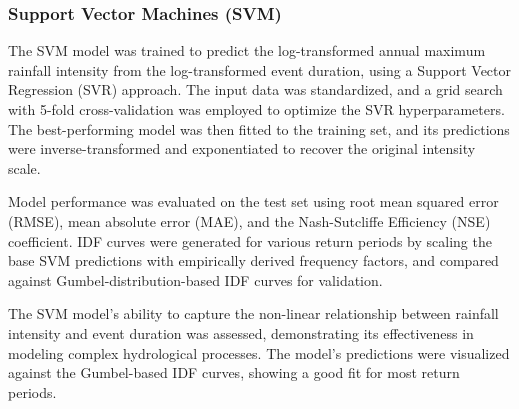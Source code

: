 \subsubsection{Support Vector Machines (SVM)}
The SVM model was trained to predict the log-transformed annual maximum rainfall intensity from the log-transformed event duration, using a Support Vector Regression (SVR) approach. The input data was standardized, and a grid search with 5-fold cross-validation was employed to optimize the SVR hyperparameters. The best-performing model was then fitted to the training set, and its predictions were inverse-transformed and exponentiated to recover the original intensity scale.

\vspace{1em}

Model performance was evaluated on the test set using root mean squared error (RMSE), mean absolute error (MAE), and the Nash-Sutcliffe Efficiency (NSE) coefficient. IDF curves were generated for various return periods by scaling the base SVM predictions with empirically derived frequency factors, and compared against Gumbel-distribution-based IDF curves for validation.

\vspace{1em}

The SVM model's ability to capture the non-linear relationship between rainfall intensity and event duration was assessed, demonstrating its effectiveness in modeling complex hydrological processes. The model's predictions were visualized against the Gumbel-based IDF curves, showing a good fit for most return periods.